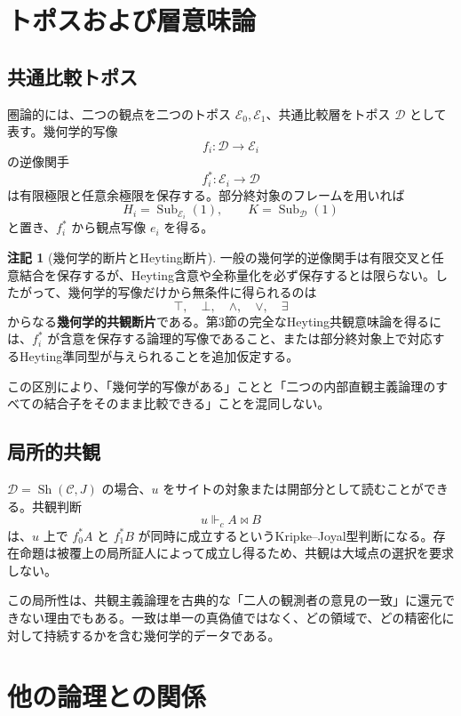 \documentclass[a4paper,11pt]{ltjsarticle}
\theoremstyle{definition}
\newtheorem{remark}[definition]{注記}
\theoremstyle{plain}
\newcommand{\Sub}{\operatorname{Sub}}
\newcommand{\Sh}{\operatorname{Sh}}
\newcommand{\forcesc}{\Vdash_{\!c}}
\begin{document}
\section{トポスおよび層意味論}

\subsection{共通比較トポス}

圏論的には、二つの観点を二つのトポス $\mathcal E_0,\mathcal E_1$、共通比較層をトポス $\mathcal D$ として表す。幾何学的写像
\[
 f_i:\mathcal D\longrightarrow\mathcal E_i
\]
の逆像関手
\[
 f_i^*:\mathcal E_i\longrightarrow\mathcal D
\]
は有限極限と任意余極限を保存する\cite{johnstone,FourmanScott1979}。部分終対象のフレームを用いれば
\[
 H_i=\Sub_{\mathcal E_i}(1),
 \qquad
 K=\Sub_{\mathcal D}(1)
\]
と置き、$f_i^*$ から観点写像 $e_i$ を得る。

\begin{remark}[幾何学的断片とHeyting断片]
一般の幾何学的逆像関手は有限交叉と任意結合を保存するが、Heyting含意や全称量化を必ず保存するとは限らない。したがって、幾何学的写像だけから無条件に得られるのは
\[
 \top,\quad\bot,\quad\land,\quad\lor,\quad\exists
\]
からなる\textbf{幾何学的共観断片}である。第3節の完全なHeyting共観意味論を得るには、$f_i^*$ が含意を保存する論理的写像であること、または部分終対象上で対応するHeyting準同型が与えられることを追加仮定する。
\end{remark}

この区別により、「幾何学的写像がある」ことと「二つの内部直観主義論理のすべての結合子をそのまま比較できる」ことを混同しない。

\subsection{局所的共観}

$\mathcal D=\Sh(\mathcal C,J)$ の場合、$u$ をサイトの対象または開部分として読むことができる。共観判断
\[
 u\forcesc A\bowtie B
\]
は、$u$ 上で $f_0^*A$ と $f_1^*B$ が同時に成立するというKripke--Joyal型判断になる。存在命題は被覆上の局所証人によって成立し得るため、共観は大域点の選択を要求しない。

この局所性は、共観主義論理を古典的な「二人の観測者の意見の一致」に還元できない理由でもある。一致は単一の真偽値ではなく、どの領域で、どの精密化に対して持続するかを含む幾何学的データである。

\section{他の論理との関係}
\end{document}
